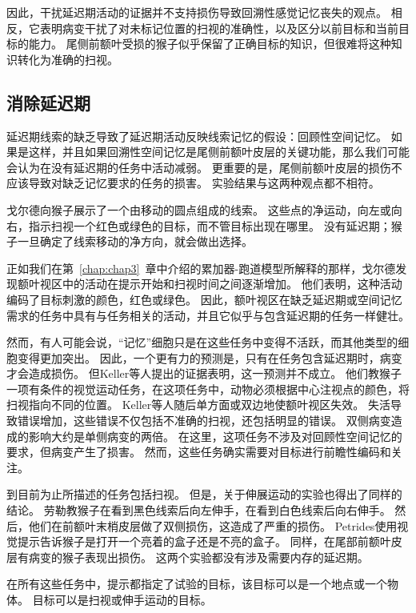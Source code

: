 因此，干扰延迟期活动的证据并不支持损伤导致回溯性感觉记忆丧失的观点。
相反，它表明病变干扰了对未标记位置的扫视的准确性，以及区分以前目标和当前目标的能力。
尾侧前额叶受损的猴子似乎保留了正确目标的知识，但很难将这种知识转化为准确的扫视。



\subsection{消除延迟期}

延迟期线索的缺乏导致了延迟期活动反映线索记忆的假设：回顾性空间记忆。
如果是这样，并且如果回溯性空间记忆是尾侧前额叶皮层的关键功能，那么我们可能会认为在没有延迟期的任务中活动减弱。
更重要的是，尾侧前额叶皮层的损伤不应该导致对缺乏记忆要求的任务的损害。
实验结果与这两种观点都不相符。


戈尔德\cite{gold2007neural}向猴子展示了一个由移动的圆点组成的线索。
这些点的净运动，向左或向右，指示扫视一个红色或绿色的目标，而不管目标出现在哪里。
没有延迟期；猴子一旦确定了线索移动的净方向，就会做出选择。


正如我们在第~\ref{chap:chap3}~章中介绍的累加器-跑道模型所解释的那样，戈尔德发现额叶视区中的活动在提示开始和扫视时间之间逐渐增加。
他们表明，这种活动编码了目标刺激的颜色，红色或绿色。
因此，额叶视区在缺乏延迟期或空间记忆需求的任务中具有与任务相关的活动，并且它似乎与包含延迟期的任务一样健壮。


然而，有人可能会说，“记忆”细胞只是在这些任务中变得不活跃，而其他类型的细胞变得更加突出。
因此，一个更有力的预测是，只有在任务包含延迟期时，病变才会造成损伤。
但Keller等人\cite{keller2008effect}提出的证据表明，这一预测并不成立。
他们教猴子一项有条件的视觉运动任务，在这项任务中，动物必须根据中心注视点的颜色，将扫视指向不同的位置。
Keller等人随后单方面或双边地使额叶视区失效。
失活导致错误增加，这些错误不仅包括不准确的扫视，还包括明显的错误。
双侧病变造成的影响大约是单侧病变的两倍。
在这里，这项任务不涉及对回顾性空间记忆的要求，但病变产生了损害。
然而，这些任务确实需要对目标进行前瞻性编码和关注。


到目前为止所描述的任务包括扫视。
但是，关于伸展运动的实验也得出了同样的结论。
劳勒\cite{lawler1987role}教猴子在看到黑色线索后向左伸手，在看到白色线索后向右伸手。
然后，他们在前额叶末梢皮层做了双侧损伤，这造成了严重的损伤。
Petrides\cite{petrides1985deficits}使用视觉提示告诉猴子是打开一个亮着的盒子还是不亮的盒子。
同样，在尾部前额叶皮层有病变的猴子表现出损伤。
这两个实验都没有涉及需要内存的延迟期。


在所有这些任务中，提示都指定了试验的目标，该目标可以是一个地点\cite{keller2008effect}或一个物体\cite{petrides1985deficits}。
目标可以是扫视\cite{keller2008effect}或伸手运动\cite{lawler1987role}的目标。


